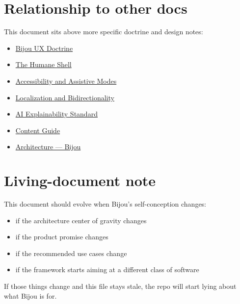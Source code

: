 \section{Relationship to other docs}\label{record-035-relationship-to-other-docs}

This document sits above more specific doctrine and design notes:

\begin{itemize}
\tightlist
\item
  \href{https://github.com/flyingrobots/bijou/blob/cbd70612140e7a450d764b3c7be1c6af878b99bc/docs/strategy/bijou-ux-doctrine.md}{Bijou UX Doctrine}
\item
  \href{https://github.com/flyingrobots/bijou/blob/cbd70612140e7a450d764b3c7be1c6af878b99bc/docs/strategy/humane-shell.md}{The Humane Shell}
\item
  \href{https://github.com/flyingrobots/bijou/blob/cbd70612140e7a450d764b3c7be1c6af878b99bc/docs/strategy/accessibility-and-assistive-modes.md}{Accessibility and Assistive Modes}
\item
  \href{https://github.com/flyingrobots/bijou/blob/cbd70612140e7a450d764b3c7be1c6af878b99bc/docs/strategy/localization-and-bidirectionality.md}{Localization and Bidirectionality}
\item
  \href{https://github.com/flyingrobots/bijou/blob/cbd70612140e7a450d764b3c7be1c6af878b99bc/docs/strategy/ai-explainability-standard.md}{AI Explainability Standard}
\item
  \href{https://github.com/flyingrobots/bijou/blob/cbd70612140e7a450d764b3c7be1c6af878b99bc/docs/strategy/content-guide.md}{Content Guide}
\item
  \href{https://github.com/flyingrobots/bijou/blob/cbd70612140e7a450d764b3c7be1c6af878b99bc/docs/ARCHITECTURE.md}{Architecture --- Bijou}
\end{itemize}

\section{Living-document note}\label{record-035-living-document-note}

This document should evolve when Bijou's self-conception changes:

\begin{itemize}
\tightlist
\item
  if the architecture center of gravity changes
\item
  if the product promise changes
\item
  if the recommended use cases change
\item
  if the framework starts aiming at a different class of software
\end{itemize}

If those things change and this file stays stale, the repo will start lying about what Bijou is for.

